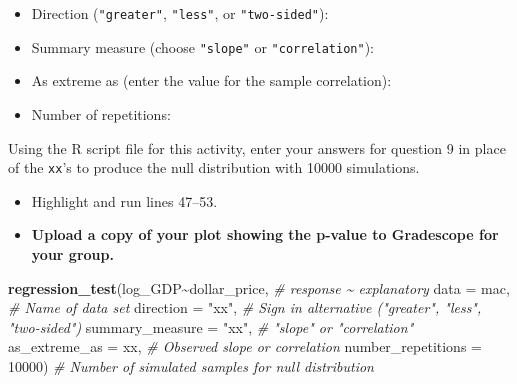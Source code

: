 \documentclass[
]{report}
\newenvironment{Shaded}{\begin{snugshade}}{\end{snugshade}}
\newcommand{\AttributeTok}[1]{\textcolor[rgb]{0.13,0.29,0.53}{#1}}
\newcommand{\CommentTok}[1]{\textcolor[rgb]{0.56,0.35,0.01}{\textit{#1}}}
\newcommand{\DecValTok}[1]{\textcolor[rgb]{0.00,0.00,0.81}{#1}}
\newcommand{\FunctionTok}[1]{\textcolor[rgb]{0.13,0.29,0.53}{\textbf{#1}}}
\newcommand{\NormalTok}[1]{#1}
\newcommand{\SpecialCharTok}[1]{\textcolor[rgb]{0.81,0.36,0.00}{\textbf{#1}}}
\newcommand{\StringTok}[1]{\textcolor[rgb]{0.31,0.60,0.02}{#1}}
\providecommand{\tightlist}{%
  \setlength{\itemsep}{0pt}\setlength{\parskip}{0pt}}
\begin{document}
\vspace{.5 mm}

\begin{itemize}
\tightlist
\item
  Direction (\texttt{"greater"}, \texttt{"less"}, or \texttt{"two-sided"}):
\end{itemize}

\vspace{.2in}

\begin{itemize}
\tightlist
\item
  Summary measure (choose \texttt{"slope"} or \texttt{"correlation"}):
\end{itemize}

\vspace{.2in}

\begin{itemize}
\tightlist
\item
  As extreme as (enter the value for the sample correlation):
\end{itemize}

\vspace{0.2in}

\begin{itemize}
\tightlist
\item
  Number of repetitions:
\end{itemize}

\vspace{.2in}

Using the R script file for this activity, enter your answers for question 9 in place of the \texttt{xx}'s to produce the null distribution with 10000 simulations.

\begin{itemize}
\item
  Highlight and run lines 47--53.
\item
  \textbf{Upload a copy of your plot showing the p-value to Gradescope for your group.}
\end{itemize}

\begin{Shaded}
\begin{Highlighting}[]
\FunctionTok{regression\_test}\NormalTok{(log\_GDP}\SpecialCharTok{\textasciitilde{}}\NormalTok{dollar\_price, }\CommentTok{\# response \textasciitilde{} explanatory}
               \AttributeTok{data =}\NormalTok{ mac, }\CommentTok{\# Name of data set}
               \AttributeTok{direction =} \StringTok{"xx"}\NormalTok{, }\CommentTok{\# Sign in alternative ("greater", "less", "two{-}sided")}
               \AttributeTok{summary\_measure  =} \StringTok{"xx"}\NormalTok{, }\CommentTok{\# "slope" or "correlation"}
               \AttributeTok{as\_extreme\_as =}\NormalTok{ xx, }\CommentTok{\# Observed slope or correlation}
               \AttributeTok{number\_repetitions =} \DecValTok{10000}\NormalTok{) }\CommentTok{\# Number of simulated samples for null distribution}
\end{Highlighting}
\end{Shaded}
\end{document}
